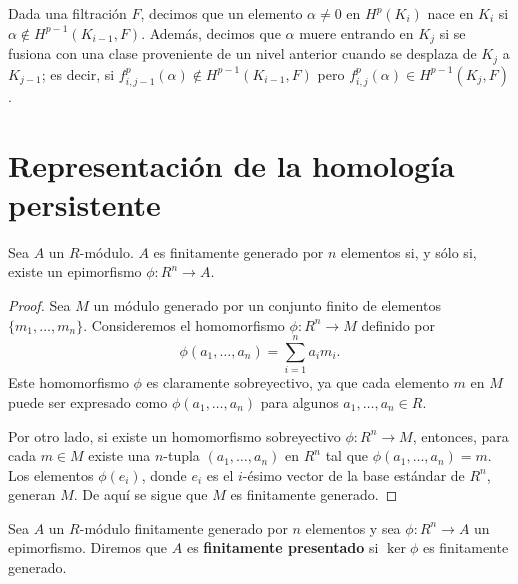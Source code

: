 \begin{definicion}
	Dada una filtración $F$, decimos que un elemento $\alpha \neq 0$ en $H^p(K_i)$ nace en $K_i$ si $\alpha \not\in H^{p-1}(K_{i-1},F)$. Además, decimos que $\alpha$ muere entrando en $K_j$ si se fusiona con una clase proveniente de un nivel anterior cuando se desplaza de $K_j$ a $K_{j-1}$; es decir, si $f_{i,j-1}^p(\alpha) \not\in H^{p-1}(K_{i-1},F)$ pero $f_{i,j}^p(\alpha) \in H^{p-1}(K_j,F)$.
\end{definicion}

\section{Representación de la homología persistente}
\begin{lema}
	Sea \( A \) un \( R \)-módulo. \( A \) es finitamente generado por \( n \) elementos si, y sólo si, existe un epimorfismo \( \phi : R^n \to A \).
\end{lema}

\begin{proof}
	Sea \( M \) un módulo generado por un conjunto finito de elementos \( \{m_1, \ldots, m_n\} \). Consideremos el homomorfismo \( \phi: R^n \rightarrow M \) definido por
	\[
	\phi(a_1, \ldots, a_n) = \sum_{i=1}^n a_i m_i.
	\]
	Este homomorfismo \( \phi \) es claramente sobreyectivo, ya que cada elemento \( m \) en \( M \) puede ser expresado como \( \phi(a_1, \ldots, a_n) \) para algunos \( a_1, \ldots, a_n \in R \).
	
	Por otro lado, si existe un homomorfismo sobreyectivo \( \phi: R^n \rightarrow M \), entonces, para cada \( m \in M \) existe una \( n \)-tupla \( (a_1, \ldots, a_n) \) en \( R^n \) tal que \( \phi(a_1, \ldots, a_n) = m \). Los elementos \( \phi(e_i) \), donde \( e_i \) es el \( i \)-ésimo vector de la base estándar de \( R^n \), generan \( M \). De aquí se sigue que \( M \) es finitamente generado.
\end{proof}

\begin{definicion}
	Sea \( A \) un \( R \)-módulo finitamente generado por \( n \) elementos y sea \( \phi : R^n \to A \) un epimorfismo. Diremos que \( A \) es \textbf{finitamente presentado} si \( \ker \phi \) es finitamente generado.
\end{definicion}

